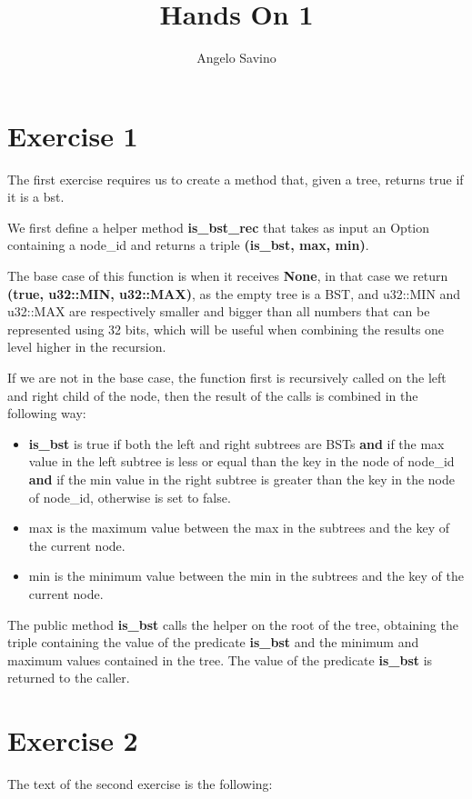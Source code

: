 \documentclass[12pt,a4paper]{article}
\title{Hands On 1}
\author{Angelo Savino}
\begin{document}
\maketitle

\section*{Exercise 1}
The first exercise requires us to create a method that, given a tree, returns true if it is a bst.

We first define a helper method \textbf{is\_bst\_rec} that takes as input an Option containing a node\_id and returns a triple \textbf{(is\_bst, max, min)}. 

The base case of this function is when it receives \textbf{None}, in that case we return \textbf{(true, u32::MIN, u32::MAX)}, as the empty tree is a BST, and u32::MIN and u32::MAX are respectively smaller and bigger than all numbers that can be represented using 32 bits, which will be useful when combining the results one level higher in the recursion.

If we are not in the base case, the function first is recursively called on the left and right child of the node, then the result of the calls is combined in the following way:

\begin{itemize}
    \item \textbf{is\_bst} is true if both the left and right subtrees are BSTs \textbf{and} if the max value in the left subtree is less or equal than the key in the node of node\_id \textbf{and} if the min value in the right subtree is greater than the key in the node of node\_id, otherwise is set to false.
    \item max is the maximum value between the max in the subtrees and the key of the current node.
    \item min is the minimum value between the min in the subtrees and the key of the current node.
\end{itemize}

The public method \textbf{is\_bst} calls the helper on the root of the tree, obtaining the triple containing the value of the predicate \textbf{is\_bst} and the minimum and maximum values contained in the tree. The value of the predicate \textbf{is\_bst} is returned to the caller.

\pagebreak
\section*{Exercise 2}
The text of the second exercise is the following:
\end{document}
